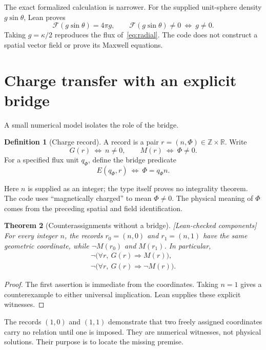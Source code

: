 \documentclass[11pt]{article}
\newtheorem{theorem}{Theorem}[section]
\theoremstyle{definition}\newtheorem{definition}[theorem]{Definition}
\theoremstyle{remark}\newtheorem{remark}[theorem]{Remark}
\newcommand{\R}{\mathbb{R}}
\newcommand{\Z}{\mathbb{Z}}
\newcommand{\checked}{\textnormal{\small[Lean-checked components]}\ }
\begin{document}
The exact formalized calculation is narrower. For the supplied unit-sphere density $g\sin\theta$, Lean proves
\begin{equation}\label{eq:radialflux}
 \mathcal F(g\sin\theta)=4\pi g,\qquad
 \mathcal F(g\sin\theta)\neq0\ \Longleftrightarrow\ g\neq0.
\end{equation}
Taking $g=\kappa/2$ reproduces the flux of~\eqref{eq:radial}. The code does not construct a spatial vector field or prove its Maxwell equations.

\section{Charge transfer with an explicit bridge}
A small numerical model isolates the role of the bridge.
\begin{definition}[Charge record]\label{def:record}
A record is a pair $r=(n,\Phi)\in\Z\times\R$. Write
\[
 G(r)\ \Longleftrightarrow\ n\neq0,\qquad
 M(r)\ \Longleftrightarrow\ \Phi\neq0.
\]
For a specified flux unit $q_\Phi$, define the bridge predicate
\begin{equation}\label{eq:recordbridge}
 E(q_\Phi,r)\ \Longleftrightarrow\ \Phi=q_\Phi n.
\end{equation}
\end{definition}
Here $n$ is supplied as an integer; the type itself proves no integrality theorem. The code uses ``magnetically charged'' to mean $\Phi\neq0$. The physical meaning of $\Phi$ comes from the preceding spatial and field identification.

\begin{theorem}[Counterassignments without a bridge]\label{thm:counter}\checked
For every integer $n$, the records $r_0=(n,0)$ and $r_1=(n,1)$ have the same geometric coordinate, while $\neg M(r_0)$ and $M(r_1)$. In particular,
\begin{align}
 \neg\bigl(\forall r,\ G(r)\Rightarrow M(r)\bigr),\\
 \neg\bigl(\forall r,\ G(r)\Rightarrow\neg M(r)\bigr).
\end{align}
\end{theorem}
\begin{proof}
The first assertion is immediate from the coordinates. Taking $n=1$ gives a counterexample to either universal implication. Lean supplies these explicit witnesses.
\end{proof}
The records $(1,0)$ and $(1,1)$ demonstrate that two freely assigned coordinates carry no relation until one is imposed. They are numerical witnesses, not physical solutions. Their purpose is to locate the missing premise.
\end{document}

